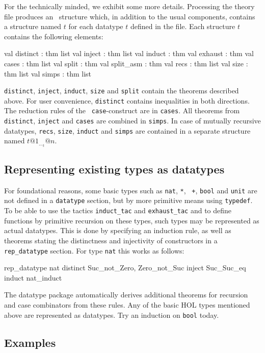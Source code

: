 For the technically minded, we exhibit some more details.  Processing the
theory file produces an \ML\ structure which, in addition to the usual
components, contains a structure named $t$ for each datatype $t$ defined in
the file.  Each structure $t$ contains the following elements:
\begin{ttbox}
val distinct : thm list
val inject : thm list
val induct : thm
val exhaust : thm
val cases : thm list
val split : thm
val split_asm : thm
val recs : thm list
val size : thm list
val simps : thm list
\end{ttbox}
\texttt{distinct}, \texttt{inject}, \texttt{induct}, \texttt{size}
and \texttt{split} contain the theorems
described above.  For user convenience, \texttt{distinct} contains
inequalities in both directions.  The reduction rules of the {\tt
  case}-construct are in \texttt{cases}.  All theorems from {\tt
  distinct}, \texttt{inject} and \texttt{cases} are combined in \texttt{simps}.
In case of mutually recursive datatypes, \texttt{recs}, \texttt{size}, \texttt{induct}
and \texttt{simps} are contained in a separate structure named $t@1_\ldots_t@n$.


\subsection{Representing existing types as datatypes}

For foundational reasons, some basic types such as \texttt{nat}, \texttt{*}, {\tt
  +}, \texttt{bool} and \texttt{unit} are not defined in a \texttt{datatype} section,
but by more primitive means using \texttt{typedef}. To be able to use the
tactics \texttt{induct_tac} and \texttt{exhaust_tac} and to define functions by
primitive recursion on these types, such types may be represented as actual
datatypes.  This is done by specifying an induction rule, as well as theorems
stating the distinctness and injectivity of constructors in a {\tt
  rep_datatype} section.  For type \texttt{nat} this works as follows:
\begin{ttbox}
rep_datatype nat
  distinct Suc_not_Zero, Zero_not_Suc
  inject   Suc_Suc_eq
  induct   nat_induct
\end{ttbox}
The datatype package automatically derives additional theorems for recursion
and case combinators from these rules.  Any of the basic HOL types mentioned
above are represented as datatypes.  Try an induction on \texttt{bool}
today.


\subsection{Examples}

